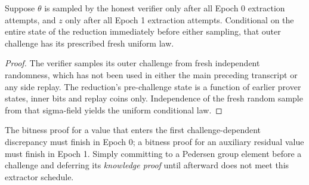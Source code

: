 \begin{lemma}\label{lem:global:outer-uniform}
Suppose $\theta$ is sampled by the honest
verifier only after all Epoch 0 extraction
attempts, and $z$ only after all Epoch 1
extraction attempts. Conditional on the
entire state of the reduction immediately
before either sampling, that outer
challenge has its prescribed fresh
uniform law.
\end{lemma}
\begin{proof}
The verifier samples its outer challenge
from fresh independent randomness, which
has not been used in either the main
preceding transcript or any side replay.
The reduction's pre-challenge state is a
function of earlier prover states, inner
bits and replay coins only. Independence
of the fresh random sample from that
sigma-field yields the uniform
conditional law.
\end{proof}

\begin{remark}
The bitness proof for a value that enters
the first challenge-dependent discrepancy
must finish in Epoch 0; a bitness proof for
an auxiliary residual value must finish in
Epoch 1. Simply committing to a Pedersen
group element before a challenge and
deferring its \emph{knowledge proof}
until afterward does not meet this
extractor schedule.
\end{remark}
